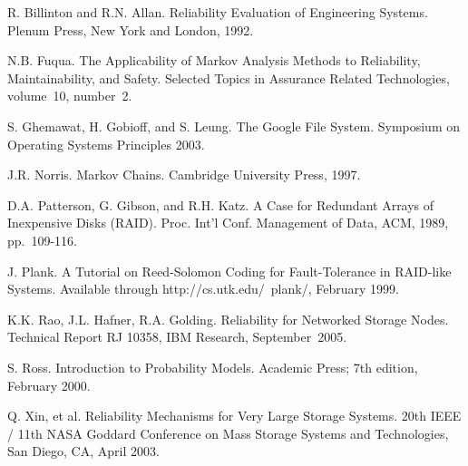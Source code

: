 \documentclass[11pt]{article}
\numberwithin{equation}{section}
\begin{document}
\begin{thebibliography}{99}

 R. Billinton and R.N. Allan. Reliability Evaluation of
Engineering Systems.  Plenum Press, New York and London, 1992.

 N.B. Fuqua.  The Applicability of Markov Analysis Methods to
Reliability, Maintainability, and Safety.  Selected Topics in Assurance
Related Technologies, volume~10, number~2.

 S. Ghemawat, H. Gobioff, and S. Leung.  The Google File
System.  Symposium on Operating Systems Principles 2003.

 J.R. Norris. Markov Chains. Cambridge University Press, 1997.

 D.A. Patterson, G. Gibson, and R.H. Katz.  A Case for Redundant
Arrays of Inexpensive Disks (RAID).  Proc. Int'l Conf. Management of
Data, ACM, 1989, pp.~109-116.

 J. Plank. A Tutorial on Reed-Solomon Coding for
Fault-Tolerance in RAID-like Systems.  Available through
http://cs.utk.edu/~plank/, February 1999.

 K.K. Rao, J.L. Hafner, R.A. Golding.  Reliability for Networked
Storage Nodes.  Technical Report RJ 10358, IBM Research, September~2005.

 S. Ross.  Introduction to Probability Models.  Academic Press;
7th edition, February 2000.

Q. Xin, et al.  Reliability Mechanisms for Very Large Storage Systems.  20th
IEEE / 11th NASA Goddard Conference on Mass Storage Systems and Technologies,
San Diego, CA, April 2003.

\end{thebibliography}
\end{document}
